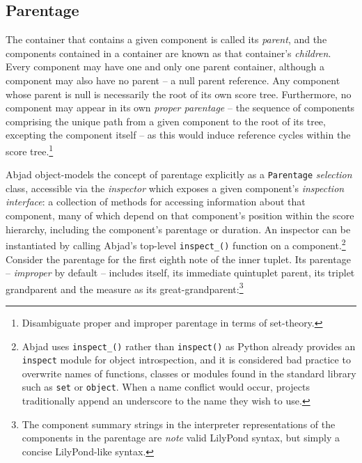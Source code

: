 \subsection{Parentage}
\label{ssec:parentage}

The container that contains a given component is called its \emph{parent}, and
the components contained in a container are known as that container's
\emph{children}. Every component may have one and only one parent container,
although a component may also have no parent -- a null parent reference. Any
component whose parent is null is necessarily the root of its own score tree.
Furthermore, no component may appear in its own \emph{proper parentage} -- the
sequence of components comprising the unique path from a given component to the
root of its tree, excepting the component itself -- as this would induce
reference cycles within the score tree.\footnote{Disambiguate proper and
improper parentage in terms of set-theory.}

Abjad object-models the concept of parentage explicitly as a \texttt{Parentage}
\emph{selection} class, accessible via the \emph{inspector} which exposes a
given component's \emph{inspection interface}: a collection of methods for
accessing information about that component, many of which depend on that
component's position within the score hierarchy, including the component's
parentage or duration. An inspector can be instantiated by calling Abjad's
top-level \texttt{inspect\_()} function on a component.\footnote{Abjad uses
\texttt{inspect\_()} rather than \texttt{inspect()} as Python already provides
an \texttt{inspect} module for object introspection, and it is considered bad
practice to overwrite names of functions, classes or modules found in the
standard library such as \texttt{set} or \texttt{object}. When a name conflict
would occur, projects traditionally append an underscore to the name they wish
to use.} Consider the parentage for the first eighth note of the inner tuplet.
Its parentage -- \emph{improper} by default -- includes itself, its immediate
quintuplet parent, its triplet grandparent and the  measure as its
great-grandparent:\footnote{The component summary strings in the interpreter
representations of the components in the parentage are \emph{note} valid
LilyPond syntax, but simply a concise LilyPond-like syntax.}

\begin{comment}
<abjad>
inner_b_eighth = measure[1][1][0]
inspector = inspect_(inner_b_eighth)
parentage = inspector.get_parentage()
parentage.parent
for component in parentage:
    component

</abjad>
\end{comment}

